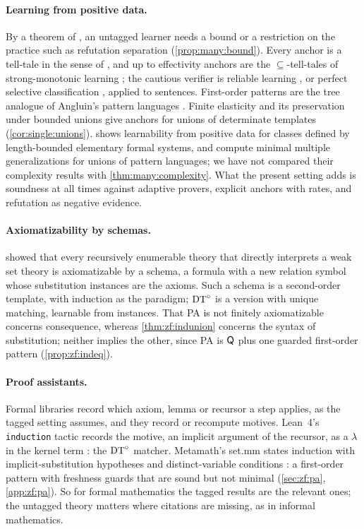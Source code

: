 \paragraph{Learning from positive data.}
By a theorem of \citet{gold1967language}, an untagged learner needs a bound or a restriction on the practice such as
refutation separation (\cref{prop:many:bound}). Every anchor is a tell-tale in the sense of
\citet{angluin1980inductive}, and up to effectivity anchors are the $\subseteq$-tell-tales of strong-monotonic
learning \citep{lange1992types}; the cautious verifier is reliable learning \citep{rivest1988learning}, or perfect
selective classification \citep{elyaniv2010foundations}, applied to sentences. First-order patterns are the tree
analogue of Angluin's pattern languages \citep{angluin1980finding}. Finite elasticity and its preservation under bounded
unions \citep{wright1989identification,motoki1991correct} give anchors for unions of determinate templates
(\cref{cor:single:unions}).  shows learnability from positive data for classes defined by
length-bounded elementary formal systems, and \citet{arimura1994finding} compute minimal multiple generalizations for
unions of pattern languages; we have not compared their complexity results with \cref{thm:many:complexity}. What the
present setting adds is soundness at all times against adaptive provers, explicit anchors with rates, and refutation
as negative evidence.

\paragraph{Axiomatizability by schemas.}
\citet{vaught1967axiomatizability} showed that every recursively enumerable theory that directly interprets a weak set
theory is axiomatizable by a schema, a formula with a new relation symbol whose substitution instances are the axioms.
Such a schema is a second-order template, with induction as the paradigm; $\mathrm{DT}^{\circ}$ is a version with unique matching,
learnable from instances. That PA is not finitely axiomatizable \citep{rylln1952axiomatizability} concerns
consequence, whereas \cref{thm:zf:indunion} concerns the syntax of substitution; neither implies the other, since PA is
$\mathsf{Q}$ plus one guarded first-order pattern (\cref{prop:zf:indeq}).

\paragraph{Proof assistants.}
Formal libraries record which axiom, lemma or recursor a step applies, as the tagged setting assumes, and they record or
recompute motives. Lean~4's \texttt{induction} tactic records the motive, an implicit argument of the recursor, as a
$\lambda$ in the kernel term \citep{demoura2021lean4}: the $\mathrm{DT}^{\circ}$ matcher. Metamath's set.mm states induction with
implicit-substitution hypotheses and distinct-variable conditions \citep{megill2019metamath}: a first-order pattern with
freshness guards that are sound but not minimal (\cref{sec:zf:pa}, \cref{app:zf:pa}). So for formal mathematics the
tagged results are the relevant ones; the untagged theory matters where citations are missing, as in informal
mathematics.

